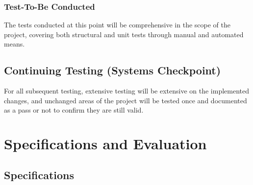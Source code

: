 \documentclass[11pt, oneside]{article}   	%
\begin{document}
\subsubsection{Test-To-Be Conducted}
The tests conducted at this point will be comprehensive in the scope of the project, covering both structural and unit tests through manual and automated means.

\subsection{Continuing Testing (Systems Checkpoint)}
For all subsequent testing, extensive testing will be extensive on the implemented changes, and unchanged areas of the project will be tested once and documented as a pass or not to confirm they are still valid.


\section{Specifications and Evaluation}
\subsection{Specifications}
\end{document}
